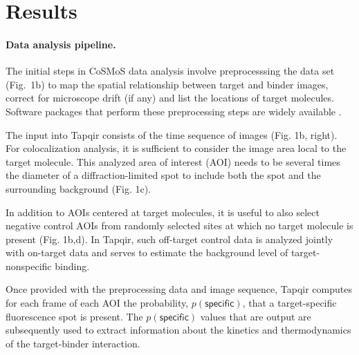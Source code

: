 \section*{Results}
\paragraph{Data analysis pipeline.} %
The initial steps in CoSMoS data analysis involve preprocesssing the data set (Fig.~1b) to map the spatial relationship between target and binder images, correct for microscope drift (if any) and list the locations of target molecules. Software packages that perform these preprocessing steps are widely available \cite{Friedman2015-nx, Smith2019-yb}.

The input into Tapqir consists of the time sequence of images (Fig. 1b, right). For colocalization analysis, it is sufficient to consider the image area local to the target molecule. This analyzed area of interest (AOI) needs to be several times the diameter of a diffraction-limited spot to include both the spot and the surrounding background (Fig. 1c). 

In addition to AOIs centered at target molecules, it is useful to also select negative control AOIs from randomly selected sites at which no target molecule is present (Fig. 1b,d). In Tapqir, such off-target control data is analyzed jointly with on-target data and serves to estimate the background level of target-nonspecific binding. 

Once provided with the preprocessing data and image sequence, Tapqir computes for each frame of each AOI the  probability, $p(\mathsf{specific})$, that a target-specific fluorescence spot is present.   The $p(\mathsf{specific})$ values that are output are subsequently used to extract information about the kinetics and thermodynamics of the target-binder interaction.

